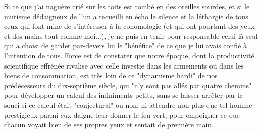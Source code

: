 Si ce que j'ai naguère crié sur les toits est tombé en des oreilles sourdes, et si le mutisme dédaigneux de l'un a recueilli en écho le silence et la léthargie de tous ceux qui font mine de s'intéresser à la cohomologie (et qui ont pourtant des yeux et des mains tout comme moi...), je ne puis en tenir pour responsable celui-là seul qui a choisi de garder par-devers lui le "bénéfice" de ce que je lui avais confié à l'intention de tous. Force est de constater que notre époque, dont la productivité scientifique effrénée rivalise avec celle investie dans les armements ou dans les biens de consommation, est très loin de ce "dynamisme hardi" de nos prédécesseurs du dix-septième siècle, qui "n'y sont pas allés par quatre chemins" pour développer un calcul des infiniments petits, sans se laisser arrêter par le souci si ce calcul était "conjectural" ou non; ni attendre non plus que tel homme prestigieux parmi eux daigne leur donner le feu vert, pour empoigner ce que chacun voyait bien de ses propres yeux et sentait de première main.

